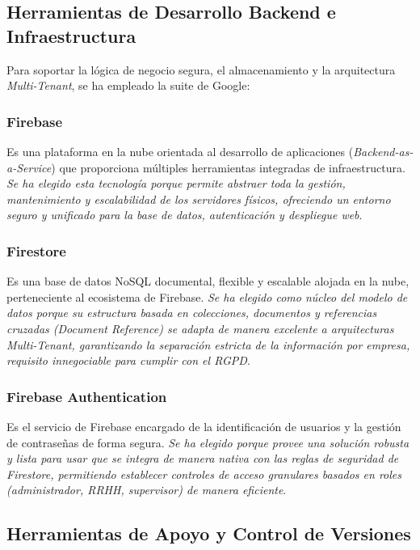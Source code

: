 \subsection{Herramientas de Desarrollo Backend e Infraestructura} \label{subsct:herramientas_backend}

Para soportar la lógica de negocio segura, el almacenamiento y la arquitectura \textit{Multi-Tenant}, se ha empleado la suite de Google:

\subsubsection{Firebase}
Es una plataforma en la nube orientada al desarrollo de aplicaciones (\textit{Backend-as-a-Service}) que proporciona múltiples herramientas integradas de infraestructura. \textit{Se ha elegido esta tecnología porque permite abstraer toda la gestión, mantenimiento y escalabilidad de los servidores físicos, ofreciendo un entorno seguro y unificado para la base de datos, autenticación y despliegue web}.

\subsubsection{Firestore}
Es una base de datos NoSQL documental, flexible y escalable alojada en la nube, perteneciente al ecosistema de Firebase. \textit{Se ha elegido como núcleo del modelo de datos porque su estructura basada en colecciones, documentos y referencias cruzadas (\textit{Document Reference}) se adapta de manera excelente a arquitecturas Multi-Tenant, garantizando la separación estricta de la información por empresa, requisito innegociable para cumplir con el RGPD}.

\subsubsection{Firebase Authentication}
Es el servicio de Firebase encargado de la identificación de usuarios y la gestión de contraseñas de forma segura. \textit{Se ha elegido porque provee una solución robusta y lista para usar que se integra de manera nativa con las reglas de seguridad de Firestore, permitiendo establecer controles de acceso granulares basados en roles (administrador, RRHH, supervisor) de manera eficiente}.


\subsection{Herramientas de Apoyo y Control de Versiones} \label{subsct:herramientas_apoyo}

